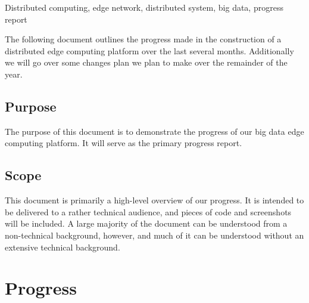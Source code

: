 \documentclass[10pt,journal,compsoc,onecolumn,draftclsnofoot]{IEEEtran}
\begin{document}
\begin{IEEEkeywords}
\centering
Distributed computing, edge network, distributed system, big data, progress report
\end{IEEEkeywords}

\pagebreak 


\IEEEdisplaynontitleabstractindextext

\IEEEpeerreviewmaketitle



\hspace*{-.5cm}The following document outlines the progress made in the construction of a distributed edge computing platform over the last several months. Additionally we will go over some changes plan we plan to make over the remainder of the year. 

\subsection{Purpose}
The purpose of this document is to demonstrate the progress of our big data edge computing platform. It will serve as the primary progress report. 

\subsection{Scope}
This document is primarily a high-level overview of our progress. It is intended to be delivered to a rather technical audience, and pieces of code and screenshots will be included. A large majority of the document can be understood from a non-technical background, however, and much of it can be understood without an extensive technical background.

\section{Progress}
\end{document}

